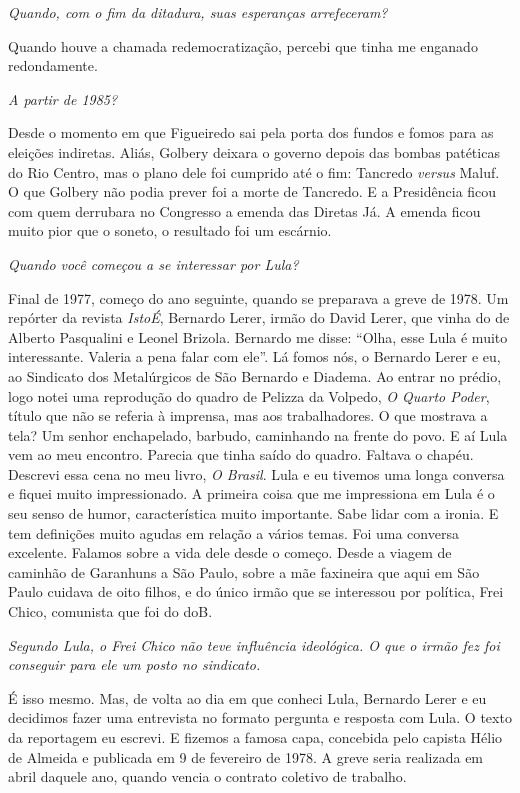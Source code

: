 \itshape
 Quando, com o fim da ditadura, suas esperanças
arrefeceram?

\normalfont 
Quando houve a chamada redemocratização, percebi que
tinha me enganado redondamente.

\itshape
 A partir de 1985?

\normalfont 
Desde o momento em que Figueiredo sai pela porta dos
fundos e fomos para as eleições indiretas. Aliás, Golbery deixara o
governo depois das bombas patéticas do Rio Centro, mas o plano dele foi
cumprido até o fim: Tancredo \emph{versus} Maluf. O que Golbery não
podia prever foi a morte de Tancredo. E a Presidência ficou com quem
derrubara no Congresso a emenda das Diretas Já. A emenda ficou muito
pior que o soneto, o resultado foi um escárnio.

\itshape
 Quando você começou a se interessar por Lula?

\normalfont 
Final de 1977, começo do ano seguinte, quando se
preparava a greve de 1978. Um repórter da revista \emph{IstoÉ}, Bernardo
Lerer, irmão do David Lerer, que vinha do  de Alberto Pasqualini e
Leonel Brizola. Bernardo me disse: ``Olha, esse Lula é muito
interessante. Valeria a pena falar com ele''. Lá fomos nós, o Bernardo
Lerer e eu, ao Sindicato dos Metalúrgicos de São Bernardo e Diadema. Ao
entrar no prédio, logo notei uma reprodução do quadro de Pelizza da
Volpedo, \emph{O Quarto Poder}, título que não se referia à imprensa,
mas aos trabalhadores. O que mostrava a tela? Um senhor enchapelado,
barbudo, caminhando na frente do povo. E aí Lula vem ao meu encontro.
Parecia que tinha saído do quadro. Faltava o chapéu. Descrevi essa cena
no meu livro, \emph{O Brasil}. Lula e eu tivemos uma longa conversa e
fiquei muito impressionado. A primeira coisa que me impressiona em Lula
é o seu senso de humor, característica muito importante. Sabe lidar com
a ironia. E tem definições muito agudas em relação a vários temas. Foi
uma conversa excelente. Falamos sobre a vida dele desde o começo. Desde
a viagem de caminhão de Garanhuns a São Paulo, sobre a mãe faxineira que
aqui em São Paulo cuidava de oito filhos, e do único irmão que se
interessou por política, Frei Chico, comunista que foi do doB.

\itshape
 Segundo Lula, o Frei Chico não teve influência
ideológica. O que o irmão fez foi conseguir para ele um posto no
sindicato.

\normalfont 
É isso mesmo. Mas, de volta ao dia em que conheci Lula,
Bernardo Lerer e eu decidimos fazer uma entrevista no formato pergunta e
resposta com Lula. O texto da reportagem eu escrevi. E fizemos a famosa
capa, concebida pelo capista Hélio de Almeida e publicada em 9 de
fevereiro de 1978. A greve seria realizada em abril daquele ano, quando
vencia o contrato coletivo de trabalho.

